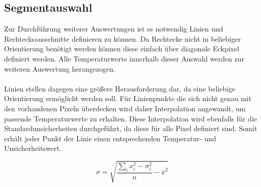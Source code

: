 \documentclass[10pt,a4paper,german]{article}
\begin{document}
\subsection{Segmentauswahl}
Zur Durchführung weiterer Auswertungen ist es notwendig Linien und Rechtecksausschnitte definieren zu können.
Da Rechtecke nicht in beliebiger Orientierung benötigt werden können diese einfach über diagonale Eckpixel definiert werden.
Alle Temperaturwerte innerhalb dieser Auswahl werden zur weiteren Auswertung herangezogen.
\\
\\
Linien stellen dagegen eine größere Herausforderung dar, da eine beliebige Orientierung ermöglicht werden soll.
Für Linienpunkte die sich nicht genau mit den vorhandenen Pixeln überdecken wird daher Interpolation angewandt, um passende Temperaturwerte zu erhalten.
Diese Interpolation wird ebenfalls für die Standardunsicherheiten durchgeführt, da diese für alle Pixel definiert sind.
Somit erhält jeder Punkt der Linie einen entsprechenden Temperatur- und Unsicherheitswert.

\begin{equation}
    \sigma = \sqrt{\frac{\sum_i x_i^2 - \sigma_i^2}{n} - \bar x^2}
\end{equation}
\end{document}
